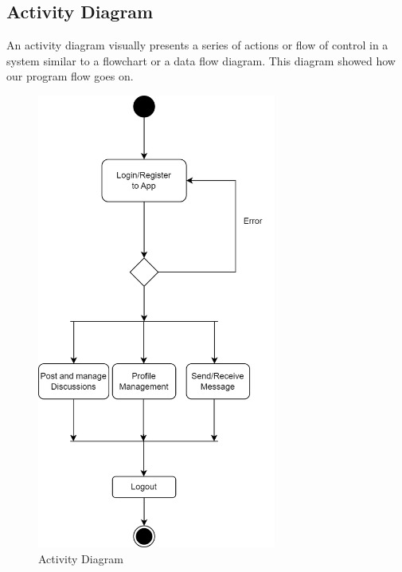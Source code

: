 \subsection{Activity Diagram}
An activity diagram visually presents a series of actions or flow of control in a system similar to a flowchart or a data flow diagram. This diagram showed how our program flow goes on.
\begin{figure}[H]
   \centering
    \includegraphics[height = 15cm]{Diagrams/Activity.drawio.png}
    \caption{Activity Diagram}
\end{figure}
\newpage

